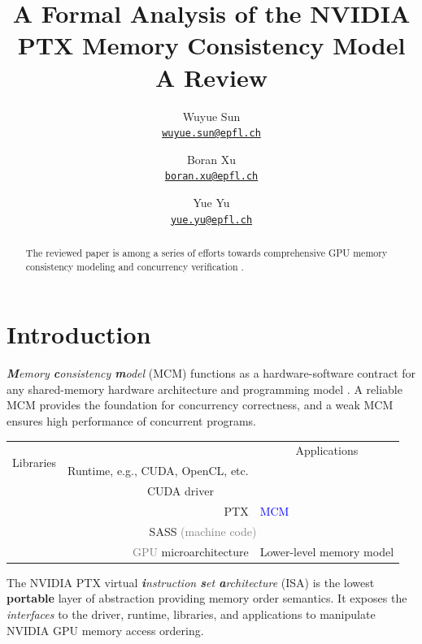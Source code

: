 \documentclass[11pt,a4paper]{article}
\title{\textbf{A Formal Analysis of the NVIDIA PTX Memory Consistency Model}\\\Large{A Review}}
\author{
    Wuyue Sun\\
    \normalsize{\href{mailto:wuyue.sun@epfl.ch}{\texttt{wuyue.sun@epfl.ch}}}
    \and
    Boran Xu\\
    \normalsize{\href{mailto:boran.xu@epfl.ch}{\texttt{boran.xu@epfl.ch}}}
    \and
    Yue Yu\\
    \normalsize{\href{mailto:yue.yu@epfl.ch}{\texttt{yue.yu@epfl.ch}}}
}
\date{}
\begin{document}
\setlength{\parindent}{0pt}

\maketitle

\begin{abstract}
\noindent The reviewed paper \cite{10.1145/3297858.3304043} is among a series of efforts towards comprehensive GPU memory consistency modeling \cite{c11, rc11, 10.1145/3297858.3304043, 10.1145/3470496.3533045} and concurrency verification \cite{hmc, cerberus-bmc, unified}.
\end{abstract}

\section{Introduction}

\textit{\textbf{M}emory \textbf{c}onsistency \textbf{m}odel} (MCM) functions as a hardware-software contract for any shared-memory hardware architecture and programming model \cite{litmus}. A reliable MCM provides the foundation for concurrency correctness, and a weak MCM ensures high performance of concurrent programs.\\

\begin{table}[H]
\centering
\begin{tabular}{rlclll}
\multicolumn{1}{l}{} & & \multicolumn{1}{l}{} & \multicolumn{3}{c}{\multirow{2}{*}{Applications}}\\ \cline{1-3}
\multicolumn{2}{r}{\multirow{2}{*}{Libraries}} & \multicolumn{1}{c|}{} & \multicolumn{3}{c}{}\\ \cline{3-4}
\multicolumn{2}{r}{} & \multicolumn{2}{|c|}{Runtime, e.g., CUDA, OpenCL, etc.} & & \\ \cline{2-5}
\multicolumn{1}{l|}{} & \multicolumn{4}{c|}{CUDA driver} & \\ \hline
\multicolumn{3}{r}{PTX} & \multicolumn{3}{l}{\textcolor{blue}{MCM}}\\ \hline
\multicolumn{6}{c}{SASS \textcolor{gray}{(machine code)}}\\ \hline
\multicolumn{3}{r}{\textcolor{gray}{GPU} microarchitecture} & \multicolumn{3}{l}{Lower-level memory model}            
\end{tabular}
\end{table}

The NVIDIA PTX virtual \textit{\textbf{i}nstruction \textbf{s}et \textbf{a}rchitecture} (ISA) \cite{ptx} is the lowest \textbf{portable} layer of abstraction providing memory order semantics. It exposes the \textit{interfaces} to the driver, runtime, libraries, and applications to manipulate NVIDIA GPU memory access ordering.\\
\end{document}
